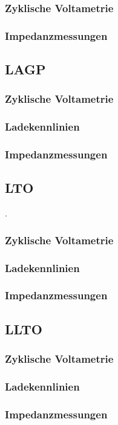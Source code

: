 \documentclass[a4paper, 11pt, headsepline,footsepline,twoside,abstract]{scrbook}
\begin{document}
\subsubsection{Zyklische Voltametrie}
\subsubsection{Impedanzmessungen}
\subsection{LAGP}
\subsubsection{Zyklische Voltametrie}
\subsubsection{Ladekennlinien}
\subsubsection{Impedanzmessungen}
\subsection{LTO}
.
\subsubsection{Zyklische Voltametrie}
\subsubsection{Ladekennlinien}
\subsubsection{Impedanzmessungen}
\subsection{LLTO}
\subsubsection{Zyklische Voltametrie}
\subsubsection{Ladekennlinien}
\subsubsection{Impedanzmessungen}
\end{document}
